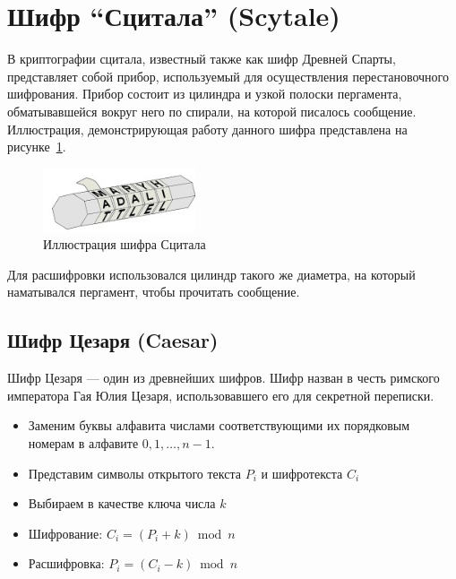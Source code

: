\documentclass[a4paper, 14pt]{extarticle}
\begin{document}
\section{Шифр ``Сцитала'' (Scytale)}
В криптографии сцитала, известный также как шифр Древней Спарты, представляет собой прибор, используемый для осуществления перестановочного шифрования. Прибор состоит из цилиндра и узкой полоски пергамента, обматывавшейся вокруг него по спирали, на которой писалось сообщение. Иллюстрация, демонстрирующая работу данного шифра представлена на рисунке~\ref{img:theory:1}.

\begin{figure}[h]
    \centering
    \includegraphics[width=0.4\textwidth]{img/S004.jpg}
    \caption{Иллюстрация шифра Сцитала}%
    \label{img:theory:1}
\end{figure}

Для расшифровки использовался цилиндр такого же диаметра, на который наматывался пергамент, чтобы прочитать сообщение.

\subsection{Шифр Цезаря (Caesar)}

Шифр Цезаря — один из древнейших шифров. Шифр назван в честь римского императора Гая Юлия Цезаря, использовавшего его для секретной переписки.

\begin{itemize}
    \item Заменим буквы алфавита числами соответствующими их порядковым номерам в алфавите $0, 1, \ldots, n-1$.
    \item Представим символы открытого текста $P_i$ и шифротекста $C_i$
    \item Выбираем в качестве ключа числа $k$
    \item Шифрование: $C_i = (P_i + k) \bmod n$ 
    \item Расшифровка: $ P_i = (C_i - k) \bmod n $
\end{itemize}
\end{document}
